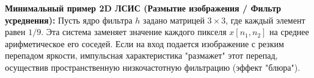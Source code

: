 \documentclass[a4paper, 12pt]{article}
\theoremstyle{definition}
\theoremstyle{plain}
\begin{document}
\textbf{Минимальный пример 2D ЛСИС (Размытие изображения / Фильтр усреднения):}
Пусть ядро фильтра $h$ задано матрицей $3 \times 3$, где каждый элемент равен $1/9$. Эта система заменяет значение каждого пикселя $x[n_1, n_2]$ на среднее арифметическое его соседей.
Если на вход подается изображение с резким перепадом яркости, импульсная характеристика "размажет" этот перепад, осуществив пространственную низкочастотную фильтрацию (эффект "блюра").
\end{document}
